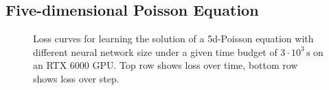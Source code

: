 \clearpage

\subsection{Five-dimensional Poisson Equation}

\begin{figure}[!h]
  \centering
  \caption{Loss curves for learning the solution of a 5d-Poisson equation with different neural network size under a given time budget of $3\cdot 10^3\,\text{s}$ on an RTX 6000 GPU.
    Top row shows loss over time, bottom row shows loss over step.}
\end{figure}

